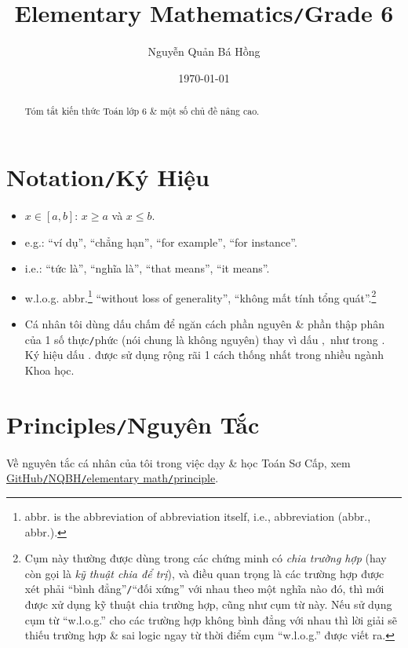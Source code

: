 \documentclass{article}
\title{Elementary Mathematics\texttt{/}Grade 6}
\author{Nguyễn Quản Bá Hồng}
\date{\today}
\numberwithin{equation}{section}
\begin{document}
\maketitle
\begin{abstract}
	Tóm tắt kiến thức Toán lớp 6 \& một số chủ đề nâng cao.
\end{abstract}
\tableofcontents


\section*{Notation\texttt{/}Ký Hiệu}
\begin{itemize}
	\item $x\in[a,b]$: $x\ge a$ và $x\le b$.
	\item e.g.: ``ví dụ'', ``chẳng hạn'', ``for example'', ``for instance''.
	\item i.e.: ``tức là'', ``nghĩa là'', ``that means'', ``it means''.
	\item w.l.o.g. abbr.\footnote{abbr. is the abbreviation of abbreviation itself, i.e., abbreviation (abbr., abbr.).} ``without loss of generality'', ``không mất tính tổng quát''.\footnote{Cụm này thường được dùng trong các chứng minh có \textit{chia trường hợp} (hay còn gọi là \textit{kỹ thuật chia để trị}), và điều quan trọng là các trường hợp được xét phải ``bình đẳng''\texttt{/}``đối xứng'' với nhau theo một nghĩa nào đó, thì mới được xử dụng kỹ thuật chia trường hợp, cũng như cụm từ này. Nếu sử dụng cụm từ ``w.l.o.g.'' cho các trường hợp không bình đẳng với nhau thì lời giải sẽ thiếu trường hợp \& sai logic ngay từ thời điểm cụm ``w.l.o.g.'' được viết ra.}
	\item Cá nhân tôi dùng dấu chấm để ngăn cách phần nguyên \& phần thập phân của 1 số thực\texttt{/}phức (nói chung là không nguyên) thay vì dấu $,$ như trong \cite{Thai_Anh_Dat_Ha_Loan_Nam_Quang_Toan_6_tap_1, Thai_Anh_Dat_Ha_Loan_Nam_Quang_Toan_6_tap_2}. Ký hiệu dấu $.$ được sử dụng rộng rãi 1 cách thống nhất trong nhiều ngành Khoa học.
\end{itemize}

\section*{Principles\texttt{/}Nguyên Tắc}
Về nguyên tắc cá nhân của tôi trong việc dạy \& học Toán Sơ Cấp, xem \href{https://github.com/NQBH/hobby/tree/master/elementary_math/principle}{GitHub\texttt{/}NQBH\texttt{/}elementary math\texttt{/}principle}.
\end{document}
